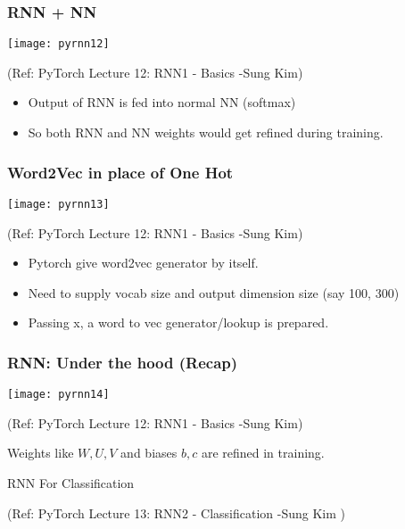 \begin{frame}[fragile] \frametitle{RNN +  NN}

\begin{center}
\texttt{[image: pyrnn12]}

\tiny{(Ref: PyTorch Lecture 12: RNN1 - Basics -Sung Kim)}
\end{center}

\begin{itemize}
\item Output of RNN is fed into normal NN (softmax)
\item So both RNN and NN weights would get refined during training.
\end{itemize}
\end{frame}


\begin{frame}[fragile] \frametitle{Word2Vec in place of One Hot}

\begin{center}
\texttt{[image: pyrnn13]}

\tiny{(Ref: PyTorch Lecture 12: RNN1 - Basics -Sung Kim)}
\end{center}

\begin{itemize}
\item Pytorch give word2vec generator by itself.
\item Need to supply vocab size and output dimension size (say 100, 300)
\item Passing x, a word to vec generator/lookup is prepared.
\end{itemize}
\end{frame}


\begin{frame}[fragile] \frametitle{RNN: Under the hood (Recap)}

\begin{center}
\texttt{[image: pyrnn14]}

\tiny{(Ref: PyTorch Lecture 12: RNN1 - Basics -Sung Kim)}
\end{center}
Weights like $W,U,V$ and biases $b,c$ are refined in training.
\end{frame}

\begin{frame}
  \begin{center}
    {\Large RNN For Classification}
    
\tiny{(Ref:  PyTorch Lecture 13: RNN2 - Classification -Sung Kim )}
  \end{center}
\end{frame}



